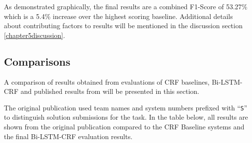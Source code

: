 As demonstrated graphically, the final results are a combined F1-Score of 53.27\% which is a 5.4\% increase over the highest scoring baseline. Additional details about contributing factors to results will be mentioned in the discussion section \ref{chapter5discussion}.

\subsection{Comparisons}\label{chapter5resultscomparisons}
A comparison of results obtained from evaluations of CRF baselines, Bi-LSTM-CRF and published results from \cite{Schneider2016} will be presented in this section.

The original publication used team names and system numbers prefixed with ``\texttt{S}'' to distinguish solution submissions for the \dimsum task. In the table below, all results are shown from the original publication compared to the CRF Baseline systems and the final Bi-LSTM-CRF evaluation results. 
